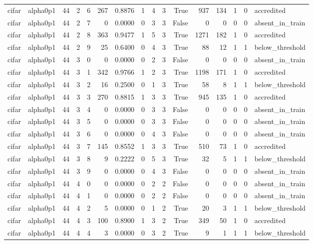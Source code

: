 \begin{tabular}{llrrrrrrrrrrrrrl}
cifar & alpha0p1 & 44 & 2 & 6 & 267 & 0.8876 & 1 & 4 & 3 & True & 937 & 134 & 1 & 0 & accredited \\
cifar & alpha0p1 & 44 & 2 & 7 & 0 & 0.0000 & 0 & 3 & 3 & False & 0 & 0 & 0 & 0 & absent\_in\_train \\
cifar & alpha0p1 & 44 & 2 & 8 & 363 & 0.9477 & 1 & 5 & 3 & True & 1271 & 182 & 1 & 0 & accredited \\
cifar & alpha0p1 & 44 & 2 & 9 & 25 & 0.6400 & 0 & 4 & 3 & True & 88 & 12 & 1 & 1 & below\_threshold \\
cifar & alpha0p1 & 44 & 3 & 0 & 0 & 0.0000 & 0 & 2 & 3 & False & 0 & 0 & 0 & 0 & absent\_in\_train \\
cifar & alpha0p1 & 44 & 3 & 1 & 342 & 0.9766 & 1 & 2 & 3 & True & 1198 & 171 & 1 & 0 & accredited \\
cifar & alpha0p1 & 44 & 3 & 2 & 16 & 0.2500 & 0 & 1 & 3 & True & 58 & 8 & 1 & 1 & below\_threshold \\
cifar & alpha0p1 & 44 & 3 & 3 & 270 & 0.8815 & 1 & 3 & 3 & True & 945 & 135 & 1 & 0 & accredited \\
cifar & alpha0p1 & 44 & 3 & 4 & 0 & 0.0000 & 0 & 3 & 3 & False & 0 & 0 & 0 & 0 & absent\_in\_train \\
cifar & alpha0p1 & 44 & 3 & 5 & 0 & 0.0000 & 0 & 3 & 3 & False & 0 & 0 & 0 & 0 & absent\_in\_train \\
cifar & alpha0p1 & 44 & 3 & 6 & 0 & 0.0000 & 0 & 4 & 3 & False & 0 & 0 & 0 & 0 & absent\_in\_train \\
cifar & alpha0p1 & 44 & 3 & 7 & 145 & 0.8552 & 1 & 3 & 3 & True & 510 & 73 & 1 & 0 & accredited \\
cifar & alpha0p1 & 44 & 3 & 8 & 9 & 0.2222 & 0 & 5 & 3 & True & 32 & 5 & 1 & 1 & below\_threshold \\
cifar & alpha0p1 & 44 & 3 & 9 & 0 & 0.0000 & 0 & 4 & 3 & False & 0 & 0 & 0 & 0 & absent\_in\_train \\
cifar & alpha0p1 & 44 & 4 & 0 & 0 & 0.0000 & 0 & 2 & 2 & False & 0 & 0 & 0 & 0 & absent\_in\_train \\
cifar & alpha0p1 & 44 & 4 & 1 & 0 & 0.0000 & 0 & 2 & 2 & False & 0 & 0 & 0 & 0 & absent\_in\_train \\
cifar & alpha0p1 & 44 & 4 & 2 & 5 & 0.0000 & 0 & 1 & 2 & True & 20 & 3 & 1 & 1 & below\_threshold \\
cifar & alpha0p1 & 44 & 4 & 3 & 100 & 0.8900 & 1 & 3 & 2 & True & 349 & 50 & 1 & 0 & accredited \\
cifar & alpha0p1 & 44 & 4 & 4 & 3 & 0.0000 & 0 & 3 & 2 & True & 9 & 1 & 1 & 1 & below\_threshold \\

\end{tabular}
